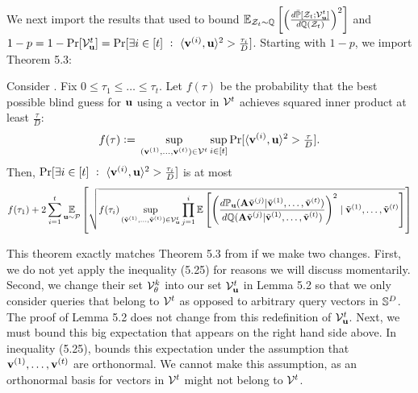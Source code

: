 We next import the results that \cite{simchowitz2017gap} used to bound \(\operatorname*{\mathbb{E}}_{{\mathcal Z}_t\sim {\mathbb Q}}\left[\left(\frac{d\bar {{\mathbb P}}[{\mathcal Z}_t;{\mathcal V}_{\boldsymbol{\mathrm{u}}}^t]}{d{\mathbb Q}({\mathcal Z}_t)}\right)^2\right]\) and \(1-p = 1-\Pr[{\mathcal V}_{\boldsymbol{\mathrm{u}}}^t] = \Pr[\exists i \in [t] ~:~ \langle \boldsymbol{\mathrm{v}}^{(i)}, \boldsymbol{\mathrm{u}}\rangle^2 > {{\textstyle\frac{\tau_i}{D}}}]\).
Starting with \(1-p\), we import Theorem 5.3:





\begin{importedtheorem}
    \label{thm:simchowitz-iterative-chisquared-unrolled}
    Consider .
    Fix \(0 \leq \tau_1 \leq \ldots \leq \tau_t\).
    Let \(f(\tau)\) be the probability that the best possible blind guess for \(\boldsymbol{\mathrm{u}}\) using a vector in \({\mathcal V}^t\) achieves squared inner product at least \(\frac{\tau}D\):
    \[
		f(\tau) \;{\vcentcolon=}\; \sup_{(\boldsymbol{\mathrm{v}}^{(1)},\ldots,\boldsymbol{\mathrm{v}}^{(t)})\in{\mathcal V}^t} \sup_{i\in[t]} \Pr[\langle \boldsymbol{\mathrm{v}}^{(i)}, \boldsymbol{\mathrm{u}}\rangle^2 > {{\textstyle\frac{\tau}{D}}}].
    \]
    Then, \(\Pr[\exists i \in [t] ~:~ \langle \boldsymbol{\mathrm{v}}^{(i)}, \boldsymbol{\mathrm{u}}\rangle^2 > {{\textstyle\frac{\tau_i}{D}}}]\) is at most
    \begin{align*}
        f(\tau_1) + 2\sum_{i=1}^t
        \operatorname*{\mathbb{E}}_{\boldsymbol{\mathrm{u}}\sim{\mathcal P}}
        \left[\sqrt{
            f(\tau_i)
            \sup_{(\tilde{\boldsymbol{\mathrm{v}}}^{(1)},\ldots,\tilde{\boldsymbol{\mathrm{v}}}^{(t)})\in{\mathcal V}^t_{\boldsymbol{\mathrm{u}}}}
            \prod_{j=1}^i \operatorname*{\mathbb{E}}\left[ \left(\frac{d{\mathbb P}_{\boldsymbol{\mathrm{u}}}(\mathbf{A}\tilde{\boldsymbol{\mathrm{v}}}^{(j)} | \tilde{\boldsymbol{\mathrm{v}}}^{(1)},\ldots,\tilde{\boldsymbol{\mathrm{v}}}^{(t)})}{d{\mathbb Q}(\mathbf{A}\tilde{\boldsymbol{\mathrm{v}}}^{(j)} | \tilde{\boldsymbol{\mathrm{v}}}^{(1)},\ldots,\tilde{\boldsymbol{\mathrm{v}}}^{(t)})}\right)^2 
            \mid
            \tilde{\boldsymbol{\mathrm{v}}}^{(1)},\ldots,\tilde{\boldsymbol{\mathrm{v}}}^{(t)}
            \right]
        } \right]
    \end{align*}
\end{importedtheorem}
This theorem exactly matches Theorem 5.3 from \cite{simchowitz2017gap} if we make two changes.
First, we do not yet apply the inequality (5.25) for reasons we will discuss momentarily.
Second, we change their set \({\mathcal V}_{\theta}^k\) into our set \({\mathcal V}_{\boldsymbol{\mathrm{u}}}^t\) in Lemma 5.2 so that we only consider queries that belong to \({\mathcal V}^t\) as opposed to arbitrary query vectors in \({\mathbb S}^D\).
The proof of Lemma 5.2 does not change from this redefinition of \({\mathcal V}_{\boldsymbol{\mathrm{u}}}^t\).
Next, we must bound this big expectation that appears on the right hand side above.
In inequality (5.25), \cite{simchowitz2017gap} bounds this expectation under the assumption that \(\boldsymbol{\mathrm{v}}^{(1)},\ldots,\boldsymbol{\mathrm{v}}^{(t)}\) are orthonormal.
We cannot make this assumption, as an orthonormal basis for vectors in \({\mathcal V}^t\) might not belong to \({\mathcal V}^t\).
